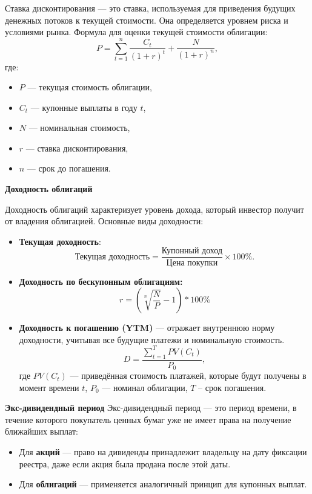 Ставка дисконтирования --- это ставка, используемая для приведения будущих денежных потоков к текущей стоимости. Она определяется уровнем риска и условиями рынка. Формула для оценки текущей стоимости облигации:
\begin{equation}
    P = \sum_{t=1}^{n} \frac{C_t}{(1 + r)^t} + \frac{N}{(1 + r)^n},
\end{equation}
\noindent где:
\begin{itemize}
    \item $P$ --- текущая стоимость облигации,
    \item $C_t$ --- купонные выплаты в году $t$,
    \item $N$ --- номинальная стоимость,
    \item $r$ --- ставка дисконтирования,
    \item $n$ --- срок до погашения.
\end{itemize}

\textbf{Доходность облигаций}

Доходность облигаций характеризует уровень дохода, который инвестор получит от владения облигацией. Основные виды доходности:
\begin{itemize}
    \item \textbf{Текущая доходность}:
    \begin{equation}
        \text{Текущая доходность} = \frac{\text{Купонный доход}}{\text{Цена покупки}} \times 100\%.
    \end{equation}
    \item \textbf{Доходность по бескупонным облигациям:}
    \begin{equation}
        r = \left( \sqrt[n]{\frac{N}{P}} - 1 \right) * 100 \%
    \end{equation}
    \item \textbf{Доходность к погашению (YTM)} --- отражает внутреннюю норму доходности, учитывая все будущие платежи и номинальную стоимость.
    \begin{equation}
        D = \frac{\sum \limits ^T _{t=1} PV(C_t)}{P_0},
    \end{equation}
    \noindent где $PV(C_t)$ --- приведённая стоимость платажей, которые будут получены в момент времени $t$, $P_0$ --- номинал облигации,  $T$ -- срок погашения.
\end{itemize}

\textbf{Экс-дивидендный период}
Экс-дивидендный период --- это период времени, в течение которого покупатель ценных бумаг уже не имеет права на получение ближайших выплат:
\begin{itemize}
    \item Для \textbf{акций} --- право на дивиденды принадлежит владельцу на дату фиксации реестра, даже если акция была продана после этой даты.
    \item Для \textbf{облигаций} --- применяется аналогичный принцип для купонных выплат.
\end{itemize}

